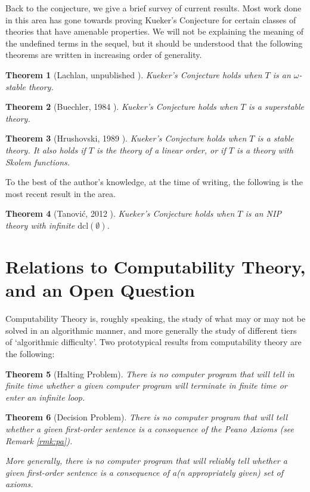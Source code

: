 \documentclass{article}
\newtheorem{theorem}{Theorem}[section]
\theoremstyle{nonumberplain}
\begin{document}
Back to the conjecture, we give a brief survey of current results. Most work done in this area has gone towards proving Kueker's Conjecture for certain classes of theories that have amenable properties. We will not be explaining the meaning of the undefined terms in the sequel, but it should be understood that the following theorems are written in increasing order of generality.

\begin{theorem}[Lachlan, unpublished \cite{kuekersuperstable}]
Kueker's Conjecture holds when $T$ is an $\omega$-stable theory.
\end{theorem}

\begin{theorem}[Buechler, 1984 \cite{kuekersuperstable}]
Kueker's Conjecture holds when $T$ is a superstable theory.
\end{theorem}

\begin{theorem}[Hrushovski, 1989 \cite{hrushovski_kueker}]
Kueker's Conjecture holds when $T$ is a stable theory. It also holds if $T$ is the theory of a linear order, or if $T$ is a theory with Skolem functions.
\end{theorem}

To the best of the author's knowledge, at the time of writing, the following is the most recent result in the area.

\begin{theorem}[Tanović, 2012 \cite{tanovic_kueker}]
Kueker's Conjecture holds when $T$ is an NIP theory with infinite $\mathrm{dcl}(\emptyset)$.
\end{theorem}

\section{Relations to Computability Theory, and an Open Question}\label{sec:comp}

Computability Theory is, roughly speaking, the study of what may or may not be solved in an algorithmic manner, and more generally the study of different tiers of `algorithmic difficulty'. Two prototypical results from computability theory are the following:
\begin{theorem}[Halting Problem]
There is no computer program that will tell in finite time whether a given computer program will terminate in finite time or enter an infinite loop.
\end{theorem}
\begin{theorem}[Decision Problem]
There is no computer program that will tell whether a given first-order sentence is a consequence of the Peano Axioms (see Remark \ref{rmk:pa}).

More generally, there is no computer program that will reliably tell whether a given first-order sentence is a consequence of a(n appropriately given) set of axioms.
\end{theorem}
\end{document}
